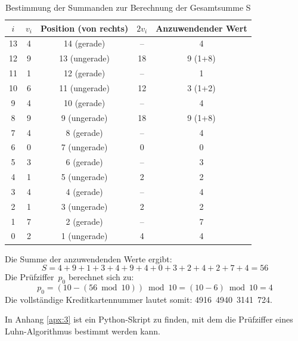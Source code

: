 \begin{table}[H]
\centering
\begin{tabular}{|c|c|c|c|c|}
\hline
$i$ & $v_i$ & Position (von rechts) & $2v_i$ & Anzuwendender Wert \\
\hline
13 & 4 & 14 (gerade) & –  & 4 \\
12 & 9 & 13 (ungerade) & 18 & 9 (1+8) \\
11 & 1 & 12 (gerade) & –  & 1 \\
10 & 6 & 11 (ungerade) & 12 & 3 (1+2) \\
9  & 4 & 10 (gerade) & –  & 4 \\
8  & 9 & 9 (ungerade)  & 18 & 9 (1+8) \\
7  & 4 & 8 (gerade) & –  & 4 \\
6  & 0 & 7 (ungerade)  & 0  & 0 \\
5  & 3 & 6 (gerade) & –  & 3 \\
4  & 1 & 5 (ungerade)  & 2  & 2 \\
3  & 4 & 4 (gerade) & –  & 4 \\
2  & 1 & 3 (ungerade)  & 2  & 2 \\
1  & 7 & 2 (gerade) & –  & 7 \\
0  & 2 & 1 (ungerade)  & 4  & 4 \\
\hline
\end{tabular}
\caption{Bestimmung der Summanden zur Berechnung der Gesamtsumme S}
\label{tab:Luhn-Beispiel}
\end{table}
Die Summe der anzuwendenden Werte ergibt: \newline \begin{equation*}
S = 4 + 9 + 1 + 3 + 4 + 9 + 4 + 0 + 3 + 2 + 4 + 2 + 7 + 4 = 56
\end{equation*}
Die Prüfziffer~$p_0$ berechnet sich zu: \newline \begin{equation*}
p_0 = (10 - (56 \bmod 10)) \bmod 10 = (10 - 6) \bmod 10 = 4
\end{equation*}
Die vollständige Kreditkartennummer lautet somit: 4916\ 4940\ 3141\ 724.

In Anhang \ref{apx:3} ist ein Python-Skript zu finden, mit dem die Prüfziffer eines Luhn-Algorithmus bestimmt werden kann.